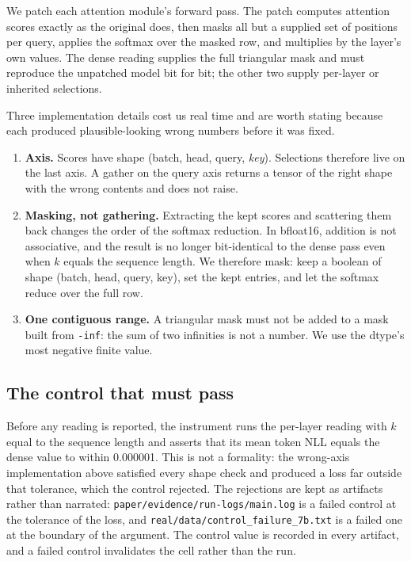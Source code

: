 \documentclass[10pt]{article}
\begin{document}
We patch each attention module's forward pass. The patch computes attention
scores exactly as the original does, then masks all but a supplied set of
positions per query, applies the softmax over the masked row, and multiplies
by the layer's own values. The dense reading supplies the full triangular mask
and must reproduce the unpatched model bit for bit; the other two supply
per-layer or inherited selections.

Three implementation details cost us real time and are worth stating because
each produced plausible-looking wrong numbers before it was fixed.

\begin{enumerate}
\item \textbf{Axis.} Scores have shape (batch, head, query, \emph{key}). Selections
      therefore live on the last axis. A gather on the query axis returns a
      tensor of the right shape with the wrong contents and does not raise.
\item \textbf{Masking, not gathering.} Extracting the kept scores and scattering
      them back changes the order of the softmax reduction. In bfloat16,
      addition is not associative, and the result is no longer bit-identical
      to the dense pass even when $k$ equals the sequence length. We therefore
      mask: keep a boolean of shape (batch, head, query, key), set the kept
      entries, and let the softmax reduce over the full row.
\item \textbf{One contiguous range.} A triangular mask must not be added to a mask
      built from \texttt{-inf}: the sum of two infinities is not a number. We
      use the dtype's most negative finite value.
\end{enumerate}

\subsection{The control that must pass}

Before any reading is reported, the instrument runs the per-layer reading with
$k$ equal to the sequence length and asserts that its mean token NLL equals the
dense value to within 0.000001. This is not a formality: the wrong-axis
implementation above satisfied every shape check and produced a loss far outside
that tolerance, which the control rejected. The rejections are kept as artifacts
rather than narrated: \texttt{paper/evidence/run-logs/main.log} is a failed
control at the tolerance of the loss, and
\texttt{real/data/control\_failure\_7b.txt} is a failed one
at the boundary of the argument. The control value is recorded in every
artifact, and a failed control invalidates the cell rather than the run.
\end{document}
